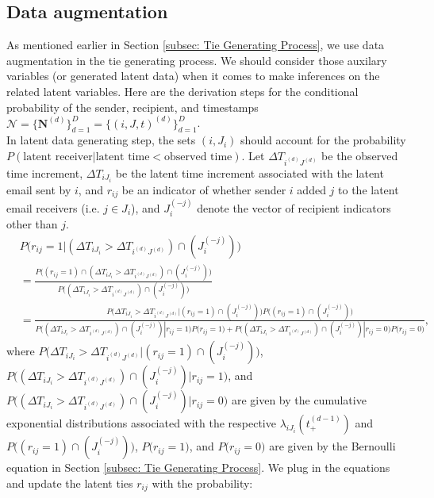 \documentclass[a4paper]{article}
\begin{document}
  \subsection{Data augmentation} \label{subsec: Data augmentation}
  As mentioned earlier in Section \ref{subsec: Tie Generating Process}, we use data augmentation in the tie generating process. We should consider those auxilary variables (or generated latent data)  when it comes to make inferences on the related latent variables. Here are the derivation steps for the conditional probability of the sender, recipient, and timestamps $\mathcal{N} = \{\boldsymbol{N}^{(d)}\}_{d=1}^D=\{(i, J, t)^{(d)}\}_{d=1}^D$.\\\newline  In latent data generating step, the sets $(i, J_i)$ should account for the probability $P(\mbox{latent receiver}| \mbox{latent time} < \mbox{observed time})$. Let $\Delta T_{i^{(d)}{J^{(d)}}}$ be the observed time increment, $\Delta T_{i{J_i}}$ be the latent time increment associated with the latent email sent by $i$, and $r_{ij}$ be an indicator of whether sender $i$ added $j$ to the latent email receivers (i.e. $j \in J_i$), and $J_i^{(-j)}$ denote the vector of recipient indicators other than $j$. 
  \begin{equation}
  \begin{split}
&P\Big(r_{ij}=1|(\Delta T_{i{J_i}} > \Delta T_{i^{(d)}{J^{(d)}}})\cap( J_i^{(-j)})\Big)\\ &=\frac{P\Big((r_{ij}=1)\cap (\Delta T_{i{J_i}} > \Delta T_{i^{(d)}{J^{(d)}}})\cap (J_i^{(-j)})\Big)}{P\Big((\Delta T_{i{J_i}} > \Delta T_{i^{(d)}{J^{(d)}}})\cap (J_i^{(-j)})\Big)}\\
& = \frac{P\Big(\Delta T_{i{J_i}} > \Delta T_{i^{(d)}{J^{(d)}}} | (r_{ij}=1)\cap (J_i^{(-j)})\Big)P\Big((r_{ij}=1) \cap (J_i^{(-j)})\Big)}{P\Big((\Delta T_{i{J_i}} > \Delta T_{i^{(d)}{J^{(d)}}})\cap (J_i^{(-j)})|r_{ij}=1\Big)P\Big(r_{ij}=1\Big)+P\Big( (\Delta T_{i{J_i}} > \Delta T_{i^{(d)}{J^{(d)}}}) \cap (J_i^{(-j)})|r_{ij}=0\Big)P\Big(r_{ij}=0\Big)},
  \end{split}
  \end{equation}
  where $P\Big(\Delta T_{i{J_i}} > \Delta T_{i^{(d)}{J^{(d)}}} | (r_{ij}=1)\cap (J_i^{(-j)})\Big)$, $P\Big((\Delta T_{i{J_i}}> \Delta T_{i^{(d)}{J^{(d)}}})\cap (J_i^{(-j)})|r_{ij}=1\Big)$, and $P\Big((\Delta T_{i{J_i}}> \Delta T_{i^{(d)}{J^{(d)}}})\cap (J_i^{(-j)})|r_{ij}=0\Big)$ are given by the cumulative exponential distributions associated with the respective $\lambda_{iJ_i}(t_+^{(d-1)})$ and $P\Big((r_{ij}=1) \cap (J_i^{(-j)})\Big)$,  $P\Big(r_{ij}=1\Big)$, and $P\Big(r_{ij}=0\Big)$ are given by the Bernoulli equation in Section \ref{subsec: Tie Generating Process}. We plug in the equations and update the latent ties $r_{ij}$ with the probability:
\end{document}
